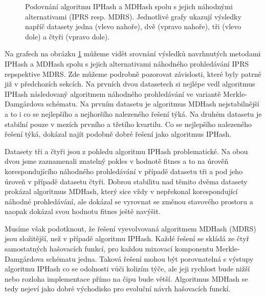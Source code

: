 \begin{figure}[!ht]
	\caption{Podovnání algoritmu IPHash a MDHash spolu s jejich náhodnými alternativami (IPRS resp. MDRS). Jednotlivé grafy ukazují výsledky napříč datasety
		jedna (vlevo nahoře), dvě (vpravo nahoře), tři (vlevo dole) a čtyři (vpravo dole).}
	\label{fig:conclusion_boxplot_1}
\end{figure}

Na grafech na obrázku \ref{fig:conclusion_boxplot_1} můžeme vidět srovnání výsledků navrhnutých metodami IPHash a MDHash spolu s jejich alternativami náhodného prohledávání
IPRS repspektive MDRS. Zde můžeme podrobně pozorovat závislosti, které byly patrné již v předchozích sekcích. Na prvních dvou datasetech si nejlépe vedl
algoritmus IPHash následovaný algoritmem náhodného prohledávání ve variantě Merkle-Damg\r{a}rdova schématu. Na prvním datasetu je algoritmus MDHash
nejstabilnější a to i co se nejlepšího a nejhoršího nalezeného řešení týká. Na druhém datasetu je stabilní pouze v mezích prvního a třetího kvartilu. Co se nejlepšího
nalezeného řešení týká, dokázal najít podobně dobré řešení jako algoritmus IPHash.

Datasety tři a čtyři jsou z pohledu algoritmu IPHash problematické. Na obou dvou jsme zaznamenali znatelný pokles v hodnotě fitnes a to na úrověň korespondujícího
náhodného prohledávání v případě datasetu tři a pod jeho úroveň v případě datasetu čtyři. Dobrou stabilitu nad těmito dvěma datasety prokázal algoritmus MDHash, který
sice vždy v nepřekonal korespondující náhodné prohledávání, ale dokázal se vyrovnat se změnou stavového prostoru a naopak dokázal svou hodnotu fitnes ještě navýšit. 

Musíme však podotknout, že řešení vyevolvovaná algoritmem MDHash (MDRS) jsou složitější, než v případě algoritmu IPHash. Každé řešení se skládá ze čtyř samostatných
hašovacích funkcí, pro každou mixovací komponentu Merkle-Damg\r{a}rdova schématu jedna. Taková řešení mohou být porovnatelná s výstupy algoritmu IPHash co se
odolnosti vůči kolizím týče, ale jeji rychlost  bude nižší nebo rozloha implementace přímo na čipu bude větší. Algoritmus MDHash se tedy nejeví jako dobré východisko pro
evoluční návrh hašovacích funckí. 

